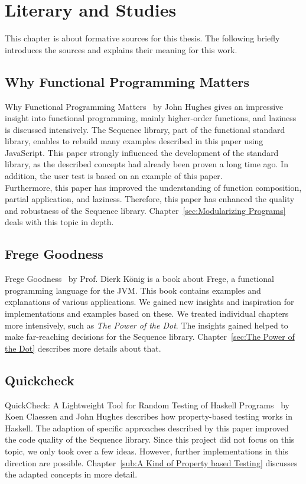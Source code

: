 \section{Literary and Studies}
\label{sec:Literary and Studies}
This chapter is about formative sources for this thesis. The following briefly
introduces the sources and explains their meaning for this work.

\subsection{Why Functional Programming Matters}
\label{sub:Functional Programming Matters}

Why Functional Programming Matters~\cite{hughes_why_1989} by John Hughes gives
an impressive insight into functional programming, mainly higher-order
functions, and laziness is discussed intensively. The Sequence library, part of
the functional standard library, enables to rebuild many examples described in
this paper using JavaScript. This paper strongly influenced the development of
the standard library, as the described concepts had already been proven a long
time ago. In addition, the user test is based on an example of this paper. \\
Furthermore, this paper has improved the understanding of function composition,
partial application, and laziness. Therefore, this paper has enhanced the
quality and robustness of the Sequence library. Chapter~\ref{sec:Modularizing
Programs} deals with this topic in depth.

\subsection{Frege Goodness}
\label{sub:Frege Goodness}
Frege Goodness~\cite{frege_goodness} by Prof. Dierk König is a book about
Frege, a functional programming language for the JVM. This book contains
examples and explanations of various applications. We gained new insights and
inspiration for implementations and examples based on these. We treated
individual chapters more intensively, such as \textit{The Power of the Dot}.
The insights gained helped to make far-reaching decisions for the Sequence
library. Chapter~\ref{sec:The Power of the Dot} describes more details about
that.

\subsection{Quickcheck}
\label{sub:Quickcheck}
QuickCheck: A Lightweight Tool for Random Testing of Haskell
Programs~\cite{quickcheck_hughes} by Koen Claessen and John Hughes describes
how property-based testing works in Haskell. The adaption of specific
approaches described by this paper improved the code quality of the Sequence
library. Since this project did not focus on this topic, we only took over a few
ideas. However, further implementations in this direction are possible.
Chapter~\ref{sub:A Kind of Property based Testing} discusses the adapted
concepts in more detail. 

